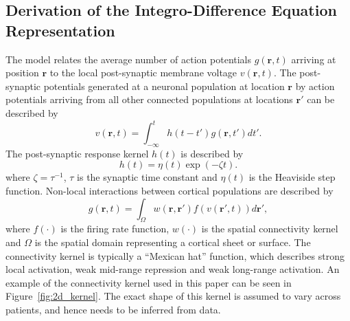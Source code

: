 \documentclass[10pt,a4paper]{article}
\begin{document}
\subsection{Derivation of the Integro-Difference Equation Representation}
The model relates the average number of action potentials $g(\mathbf{r},t)$ arriving at position $\mathbf{r}$ to the local post-synaptic membrane voltage $v(\mathbf{r},t)$. The post-synaptic potentials generated at a neuronal population at location $\mathbf{r}$ by action potentials arriving from all other connected populations at locations $\mathbf{r}'$ can be described by 
\begin{equation}
	\label{SpikesToPotential} v\left( {\mathbf{r},t} \right) = \int_{ - \infty }^t {h\left( {t - t'} \right)g\left( {\mathbf{r},t'} \right)dt'}. 
\end{equation}
The post-synaptic response kernel $h(t)$ is described by 
\begin{equation}
	\label{SynapticRespKernel} h(t) = \eta(t)\exp{\left(-\zeta t\right)}. 
\end{equation}
where $\zeta=\tau^{-1}$, $\tau$ is the synaptic time constant and $\eta(t)$ is the Heaviside step function. Non-local interactions between cortical populations are described by 
\begin{equation}
	\label{RateBasedInteractions} g\left( \mathbf{r},t \right) = \int_\Omega {w\left( \mathbf{r},\mathbf{r}' \right)f\left( v\left( \mathbf{r}',t \right) \right)d\mathbf{r}'}, 
\end{equation}
where $f(\cdot)$ is the firing rate function, $w(\cdot)$ is the spatial connectivity kernel and $\Omega$ is the spatial domain representing a cortical sheet or surface. The connectivity kernel is typically a ``Mexican hat'' function, which describes strong local activation, weak mid-range repression and weak long-range activation. An example of the connectivity kernel  used in this paper can be seen in Figure~\ref{fig:2d_kernel}. The exact shape of this kernel is assumed to vary across patients, and hence needs to be inferred from data.
\end{document}

